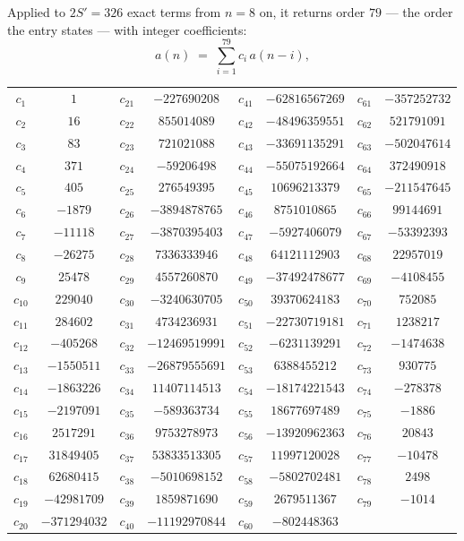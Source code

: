 \documentclass[11pt,a4paper]{article}
\theoremstyle{plain}
\theoremstyle{definition}
\begin{document}
Applied to $2S'=326$ exact terms from $n=8$ on, it returns order $79$ --- the
order the entry states --- with integer coefficients:
\[
a(n)\;=\;\sum_{i=1}^{79}c_i\,a(n-i),
\]
\begin{center}\small
\begin{tabular}{cccccccc}
$c_{1}$ & $1$ & $c_{21}$ & $-227690208$ & $c_{41}$ & $-62816567269$ & $c_{61}$ & $-357252732$ \\
$c_{2}$ & $16$ & $c_{22}$ & $855014089$ & $c_{42}$ & $-48496359551$ & $c_{62}$ & $521791091$ \\
$c_{3}$ & $83$ & $c_{23}$ & $721021088$ & $c_{43}$ & $-33691135291$ & $c_{63}$ & $-502047614$ \\
$c_{4}$ & $371$ & $c_{24}$ & $-59206498$ & $c_{44}$ & $-55075192664$ & $c_{64}$ & $372490918$ \\
$c_{5}$ & $405$ & $c_{25}$ & $276549395$ & $c_{45}$ & $10696213379$ & $c_{65}$ & $-211547645$ \\
$c_{6}$ & $-1879$ & $c_{26}$ & $-3894878765$ & $c_{46}$ & $8751010865$ & $c_{66}$ & $99144691$ \\
$c_{7}$ & $-11118$ & $c_{27}$ & $-3870395403$ & $c_{47}$ & $-5927406079$ & $c_{67}$ & $-53392393$ \\
$c_{8}$ & $-26275$ & $c_{28}$ & $7336333946$ & $c_{48}$ & $64121112903$ & $c_{68}$ & $22957019$ \\
$c_{9}$ & $25478$ & $c_{29}$ & $4557260870$ & $c_{49}$ & $-37492478677$ & $c_{69}$ & $-4108455$ \\
$c_{10}$ & $229040$ & $c_{30}$ & $-3240630705$ & $c_{50}$ & $39370624183$ & $c_{70}$ & $752085$ \\
$c_{11}$ & $284602$ & $c_{31}$ & $4734236931$ & $c_{51}$ & $-22730719181$ & $c_{71}$ & $1238217$ \\
$c_{12}$ & $-405268$ & $c_{32}$ & $-12469519991$ & $c_{52}$ & $-6231139291$ & $c_{72}$ & $-1474638$ \\
$c_{13}$ & $-1550511$ & $c_{33}$ & $-26879555691$ & $c_{53}$ & $6388455212$ & $c_{73}$ & $930775$ \\
$c_{14}$ & $-1863226$ & $c_{34}$ & $11407114513$ & $c_{54}$ & $-18174221543$ & $c_{74}$ & $-278378$ \\
$c_{15}$ & $-2197091$ & $c_{35}$ & $-589363734$ & $c_{55}$ & $18677697489$ & $c_{75}$ & $-1886$ \\
$c_{16}$ & $2517291$ & $c_{36}$ & $9753278973$ & $c_{56}$ & $-13920962363$ & $c_{76}$ & $20843$ \\
$c_{17}$ & $31849405$ & $c_{37}$ & $53833513305$ & $c_{57}$ & $11997120028$ & $c_{77}$ & $-10478$ \\
$c_{18}$ & $62680415$ & $c_{38}$ & $-5010698152$ & $c_{58}$ & $-5802702481$ & $c_{78}$ & $2498$ \\
$c_{19}$ & $-42981709$ & $c_{39}$ & $1859871690$ & $c_{59}$ & $2679511367$ & $c_{79}$ & $-1014$ \\
$c_{20}$ & $-371294032$ & $c_{40}$ & $-11192970844$ & $c_{60}$ & $-802448363$ &  &  \\
\end{tabular}
\end{center}
\end{document}

